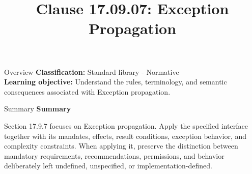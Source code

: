 \documentclass[10pt,letterpaper]{article}
\title{Clause 17.09.07: Exception Propagation}
\author{}
\date{}
\begin{document}
\maketitle
\begin{CornellOverviewBox}{Overview}
\textbf{Classification:} Standard library - Normative\\[2pt]
\textbf{Learning objective:} Understand the rules, terminology, and semantic consequences associated with Exception propagation.
\end{CornellOverviewBox}\begin{CornellSummaryBox}{Summary}
{\sffamily\bfseries\color{Accent} Summary}\par\vspace{3pt}Section 17.9.7 focuses on Exception propagation. Apply the specified interface together with its mandates, effects, result conditions, exception behavior, and complexity constraints. When applying it, preserve the distinction between mandatory requirements, recommendations, permissions, and behavior deliberately left undefined, unspecified, or implementation-defined.
\end{CornellSummaryBox}
\end{document}
